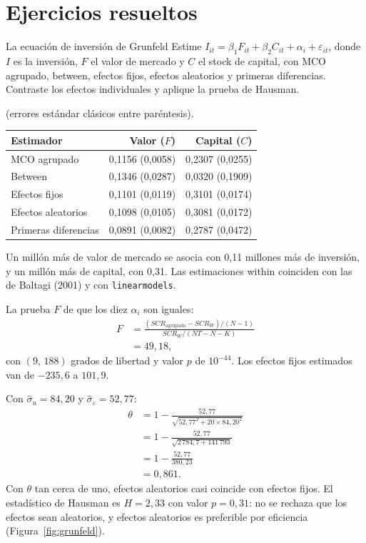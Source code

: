 \section{Ejercicios resueltos}

\begin{ejresuelto}{La ecuación de inversión de Grunfeld}\label{ej:grunfeld}
\enunciado Estime $I_{it}=\beta_1F_{it}+\beta_2C_{it}+\alpha_i+\varepsilon_{it}$, donde $I$ es la inversión, $F$ el valor de mercado y $C$ el
stock de capital, con MCO agrupado, between, efectos fijos, efectos aleatorios y primeras diferencias. Contraste los efectos
individuales y aplique la prueba de Hausman.

\solucion
{} (errores estándar clásicos entre paréntesis).
\begin{center}\small
\begin{tabular}{@{}lrr@{}}
\toprule
Estimador & Valor ($F$) & Capital ($C$) \\
\midrule
MCO agrupado & 0,1156 (0,0058) & 0,2307 (0,0255) \\
Between & 0,1346 (0,0287) & 0,0320 (0,1909) \\
Efectos fijos & 0,1101 (0,0119) & 0,3101 (0,0174) \\
Efectos aleatorios & 0,1098 (0,0105) & 0,3081 (0,0172) \\
Primeras diferencias & 0,0891 (0,0082) & 0,2787 (0,0472) \\
\bottomrule
\end{tabular}
\end{center}
Un millón más de valor de mercado se asocia con 0,11 millones más de inversión, y un millón más de capital, con 0,31. Las
estimaciones within coinciden con las de Baltagi (2001) y con \texttt{linearmodels}.

 La prueba $F$ de que los diez $\alpha_i$ son iguales:
\begin{align*}
  F &= \frac{(SCR_{\text{agrupado}}-SCR_W)/(N-1)}{SCR_W/(NT-N-K)}\\
    &= 49{,}18,
\end{align*}
con $(9,\,188)$ grados de libertad y valor $p$ de $10^{-44}$. Los efectos fijos estimados van de $-235{,}6$ a $101{,}9$.

 Con $\hat\sigma_u=84{,}20$ y $\hat\sigma_\varepsilon=52{,}77$:
\begin{align*}
  \theta &= 1-\frac{52{,}77}{\sqrt{52{,}77^2+20\times84{,}20^2}}\\
         &= 1-\frac{52{,}77}{\sqrt{2\,784{,}7+141\,793}}\\
         &= 1-\frac{52{,}77}{380{,}23}\\
         &= 0{,}861 .
\end{align*}
Con $\theta$ tan cerca de uno, efectos aleatorios casi coincide con efectos fijos. El estadístico de Hausman es $H=2{,}33$ con valor
$p=0{,}31$: no se rechaza que los efectos sean aleatorios, y efectos aleatorios es preferible por eficiencia
(Figura~\ref{fig:grunfeld}).


\end{ejresuelto}
